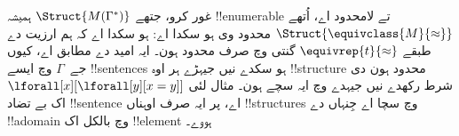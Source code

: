 \documentclass[../../../include/open-logic-section]{subfiles}
\begin{document}
\begin{digress}
غور کرو، جتھے $\Struct{M(\Gamma^*)}$
ہمیشہ !!{enumerable} تے لامحدود اے،
اُتھے $\Struct{\equivclass{M}{\approx}}$
محدود وی ہو سکدا اے: ہو سکدا اے کہ
ہم ارزیت دے طبقے
$\equivrep{t}{\approx}$ گنتی وچ
صرف محدود ہون۔ ایہ امید دے مطابق اے،
کیوں جے~$\Gamma$ وچ ایسے
!!{sentence}s ہو سکدے نیں جیہڑے ہر
اوہ !!{structure} محدود ہون دی شرط
رکھدے نیں جیہدے وچ ایہ سچے ہون۔
مثال لئی
$\lforall[x][\lforall[y][x =
y]]$ اک بے تضاد !!{sentence} اے، پر
ایہ صرف اوہناں !!{structure}s وچ
سچا اے جِنہاں دے !!a{domain} وچ
بالکل اک !!{element} ہووے۔
\end{digress}
\end{document}
